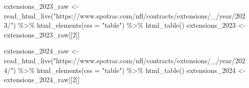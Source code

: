 \documentclass[
  letterpaper,
  DIV=11,
  numbers=noendperiod]{scrartcl}
\newenvironment{Shaded}{\begin{snugshade}}{\end{snugshade}}
\newcommand{\AttributeTok}[1]{\textcolor[rgb]{0.40,0.45,0.13}{#1}}
\newcommand{\DecValTok}[1]{\textcolor[rgb]{0.68,0.00,0.00}{#1}}
\newcommand{\FunctionTok}[1]{\textcolor[rgb]{0.28,0.35,0.67}{#1}}
\newcommand{\NormalTok}[1]{\textcolor[rgb]{0.00,0.23,0.31}{#1}}
\newcommand{\OtherTok}[1]{\textcolor[rgb]{0.00,0.23,0.31}{#1}}
\newcommand{\SpecialCharTok}[1]{\textcolor[rgb]{0.37,0.37,0.37}{#1}}
\newcommand{\StringTok}[1]{\textcolor[rgb]{0.13,0.47,0.30}{#1}}
\begin{document}
\begin{Shaded}
\begin{Highlighting}[]
\NormalTok{extensions\_2023\_raw }\OtherTok{\textless{}{-}} \FunctionTok{read\_html\_live}\NormalTok{(}\StringTok{"https://www.spotrac.com/nfl/contracts/extensions/\_/year/2023/"}\NormalTok{) }\SpecialCharTok{\%\textgreater{}\%}
  \FunctionTok{html\_elements}\NormalTok{(}\AttributeTok{css =} \StringTok{"table"}\NormalTok{) }\SpecialCharTok{\%\textgreater{}\%}
  \FunctionTok{html\_table}\NormalTok{()}
\NormalTok{extensions\_2023 }\OtherTok{\textless{}{-}}\NormalTok{ extensions\_2023\_raw[[}\DecValTok{2}\NormalTok{]]}

\NormalTok{extensions\_2024\_raw }\OtherTok{\textless{}{-}} \FunctionTok{read\_html\_live}\NormalTok{(}\StringTok{"https://www.spotrac.com/nfl/contracts/extensions/\_/year/2024/"}\NormalTok{) }\SpecialCharTok{\%\textgreater{}\%}
  \FunctionTok{html\_elements}\NormalTok{(}\AttributeTok{css =} \StringTok{"table"}\NormalTok{) }\SpecialCharTok{\%\textgreater{}\%}
  \FunctionTok{html\_table}\NormalTok{()}
\NormalTok{extensions\_2024 }\OtherTok{\textless{}{-}}\NormalTok{ extensions\_2024\_raw[[}\DecValTok{2}\NormalTok{]]}


\end{Highlighting}
\end{Shaded}
\end{document}
